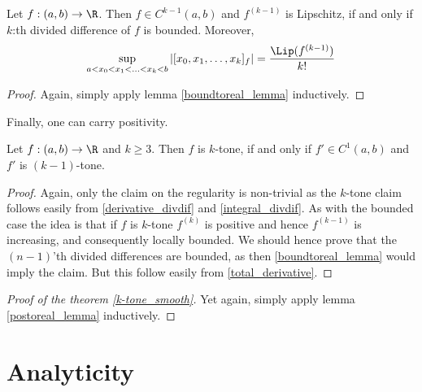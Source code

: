 \begin{lause}\label{bounded_div}
	Let $f : (a, b) \to \R$. Then $f \in C^{k - 1}(a, b)$ and $f^{(k - 1)}$ is Lipschitz, if and only if $k$:th divided difference of $f$ is bounded. Moreover,
	\begin{align*}
		\sup_{a < x_{0} < x_{1} < \ldots < x_{k}< b} |[x_{0}, x_{1}, \ldots, x_{k}]_{f}| = \frac{\Lip(f^{(k - 1)})}{k!}
	\end{align*}
\end{lause}
\begin{proof}
	Again, simply apply lemma \ref{boundtoreal_lemma} inductively.
\end{proof}

Finally, one can carry positivity.

\begin{lem}\label{postoreal_lemma}
	Let $f : (a, b) \to \R$ and $k \geq 3$. Then $f$ is $k$-tone, if and only if $f' \in C^{1}(a, b)$ and $f'$ is $(k - 1)$-tone.
\end{lem}
\begin{proof}
	Again, only the claim on the regularity is non-trivial as the $k$-tone claim follows easily from  \ref{derivative_divdif} and \ref{integral_divdif}. As with the bounded case the idea is that if $f$ is $k$-tone $f^{(k)}$ is positive and hence $f^{(k - 1)}$ is increasing, and consequently locally bounded. We should hence prove that the $(n - 1)$'th divided differences are bounded, as then \ref{boundtoreal_lemma} would imply the claim. But this follow easily from \ref{total_derivative}.
\end{proof}

\begin{proof}[Proof of the theorem \ref{k-tone_smooth}]
	Yet again, simply apply lemma \ref{postoreal_lemma} inductively.
\end{proof}

\section{Analyticity}

